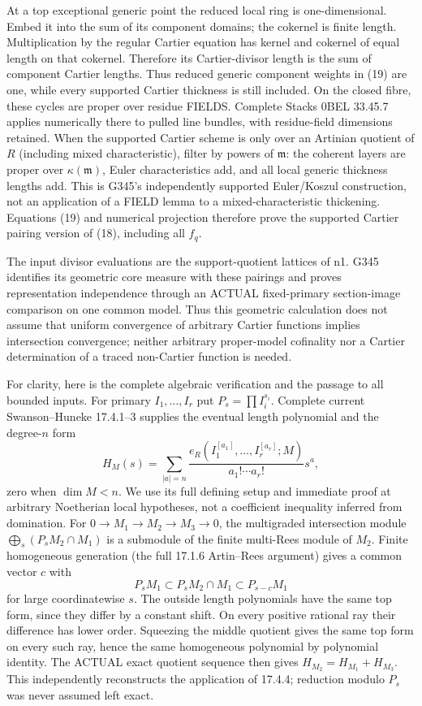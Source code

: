 At a top exceptional generic point the reduced local ring is one-dimensional. Embed it into the sum of its component domains; the cokernel is finite length. Multiplication by the regular Cartier equation has kernel and cokernel of equal length on that cokernel. Therefore its Cartier-divisor length is the sum of component Cartier lengths. Thus reduced generic component weights in (19) are one, while every supported Cartier thickness is still included. On the closed fibre, these cycles are proper over residue FIELDS. Complete Stacks 0BEL 33.45.7 applies numerically there to pulled line bundles, with residue-field dimensions retained. When the supported Cartier scheme is only over an Artinian quotient of $R$ (including mixed characteristic), filter by powers of $\mathfrak m$: the coherent layers are proper over $\kappa(\mathfrak m)$, Euler characteristics add, and all local generic thickness lengths add. This is G345's independently supported Euler/Koszul construction, not an application of a FIELD lemma to a mixed-characteristic thickening. Equations (19) and numerical projection therefore prove the supported Cartier pairing version of (18), including all $f_q$.

The input divisor evaluations are the support-quotient lattices of n1. G345 identifies its geometric core measure with these pairings and proves representation independence through an ACTUAL fixed-primary section-image comparison on one common model. Thus this geometric calculation does not assume that uniform convergence of arbitrary Cartier functions implies intersection convergence; neither arbitrary proper-model cofinality nor a Cartier determination of a traced non-Cartier function is needed.

For clarity, here is the complete algebraic verification and the passage to all bounded inputs. For primary $I_1,\ldots,I_r$ put $P_s=\prod I_i^{s_i}$. Complete current Swanson--Huneke 17.4.1--3 supplies the eventual length polynomial and the degree-$n$ form
\[
H_M(s)=\sum_{|a|=n}\frac{e_R(I_1^{[a_1]},\ldots,I_r^{[a_r]};M)}{a_1!\cdots a_r!}s^a,
\]
zero when $\dim M<n$. We use its full defining setup and immediate proof at arbitrary Noetherian local hypotheses, not a coefficient inequality inferred from domination. For $0\to M_1\to M_2\to M_3\to0$, the multigraded intersection module
$\bigoplus_s(P_sM_2\cap M_1)$ is a submodule of the finite multi-Rees module of $M_2$. Finite homogeneous generation (the full 17.1.6 Artin--Rees argument) gives a common vector $c$ with
\[
P_sM_1\subset P_sM_2\cap M_1\subset P_{s-c}M_1
\]
for large coordinatewise $s$. The outside length polynomials have the same top form, since they differ by a constant shift. On every positive rational ray their difference has lower order. Squeezing the middle quotient gives the same top form on every such ray, hence the same homogeneous polynomial by polynomial identity. The ACTUAL exact quotient sequence then gives $H_{M_2}=H_{M_1}+H_{M_3}$. This independently reconstructs the application of 17.4.4; reduction modulo $P_s$ was never assumed left exact.

